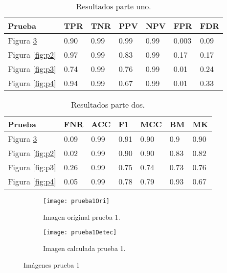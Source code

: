 \begin{table}[]
\centering
\caption{Resultados parte uno.}
\label{tab:parte1}
\begin{tabular}{@{} lllllll @{}}
\hline
Prueba                & TPR  & TNR  & PPV  & NPV  & FPR   & FDR  \\ \hline
Figura \ref{fig:p1} & 0.90 & 0.99 & 0.99 & 0.99 & 0.003 & 0.09 \\ \hline
Figura \ref{fig:p2} & 0.97 & 0.99 & 0.83 & 0.99 & 0.17  & 0.17 \\ \hline
Figura \ref{fig:p3} & 0.74 & 0.99 & 0.76 & 0.99 & 0.01  & 0.24 \\ \hline
Figura \ref{fig:p4} & 0.94 & 0.99 & 0.67 & 0.99 & 0.01  & 0.33 \\ \hline
\end{tabular}
\end{table}

\begin{table}[]
\centering
\caption{Resultados parte dos.}
\label{tab:parte2}
\begin{tabular}{@{} lllllll @{}}
\hline
Prueba                & FNR  & ACC  & F1   & MCC  & BM   & MK   \\ \hline
Figura \ref{fig:p1} & 0.09 & 0.99 & 0.91 & 0.90 & 0.9  & 0.90 \\ \hline
Figura \ref{fig:p2} & 0.02 & 0.99 & 0.90 & 0.90 & 0.83 & 0.82 \\ \hline
Figura \ref{fig:p3} & 0.26 & 0.99 & 0.75 & 0.74 & 0.73 & 0.76 \\ \hline
Figura \ref{fig:p4} & 0.05 & 0.99 & 0.78 & 0.79 & 0.93 & 0.67 \\ \hline
\end{tabular}
\end{table}





\begin{figure}
	\begin{subfigure}[c]{.5\linewidth}
	\centering\large \texttt{[image: prueba1Ori]}
	\caption{Imagen original prueba 1.}\label{fig:orip1}
	\end{subfigure}%
	\begin{subfigure}[c]{.5\linewidth}
	\centering\large \texttt{[image: prueba1Detec]}
	\caption{Imagen calculada prueba 1.}\label{fig:calcp1}
	\end{subfigure}%
	\caption{Imágenes prueba 1}
	\label{fig:p1}
\end{figure}



